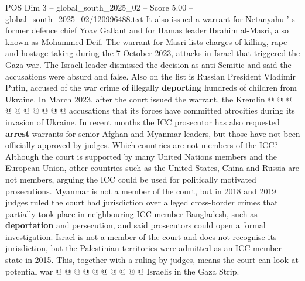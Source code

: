 \begin{textsample}{POS Dim 3 – global\_south\_2025\_02 – Score 5.00 – global\_south\_2025\_02/120996488.txt}
It also issued a warrant for Netanyahu ' s former defence chief Yoav Gallant and for Hamas leader Ibrahim al-Masri, also known as Mohammed Deif.
The warrant for Masri lists charges of killing, rape and hostage-taking during the 7 October 2023, attacks in Israel that triggered the Gaza war.
The Israeli leader dismissed the decision as anti-Semitic and said the accusations were absurd and false.
Also on the list is Russian President Vladimir Putin, accused of the war crime of illegally \textbf{deporting} hundreds of children from Ukraine.
In March 2023, after the court issued the warrant, the Kremlin @ @ @ @ @ @ @ @ @ @ accusations that its forces have committed atrocities during its invasion of Ukraine.
In recent months the ICC prosecutor has also requested \textbf{arrest} warrants for senior Afghan and Myanmar leaders, but those have not been officially approved by judges.
Which countries are not members of the ICC?
Although the court is supported by many United Nations members and the European Union, other countries such as the United States, China and Russia are not members, arguing the ICC could be used for politically motivated prosecutions.
Myanmar is not a member of the court, but in 2018 and 2019 judges ruled the court had jurisdiction over alleged cross-border crimes that partially took place in neighbouring ICC-member Bangladesh, such as \textbf{deportation} and persecution, and said prosecutors could open a formal investigation.
Israel is not a member of the court and does not recognise its jurisdiction, but the Palestinian territories were admitted as an ICC member state in 2015.
This, together with a ruling by judges, means the court can look at potential war @ @ @ @ @ @ @ @ @ @ Israelis in the Gaza Strip.

\end{textsample}
